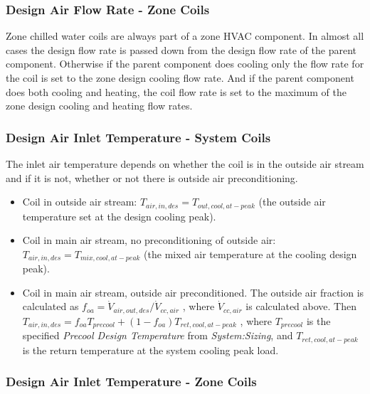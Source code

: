 \subsubsection{Design Air Flow Rate - Zone Coils}\label{design-air-flow-rate---zone-coils}

Zone chilled water coils are always part of a zone HVAC component. In almost all cases the design flow rate is passed down from the design flow rate of the parent component. Otherwise if the parent component does cooling only the flow rate for the coil is set to the zone design cooling flow rate. And if the parent component does both cooling and heating, the coil flow rate is set to the maximum of the zone design cooling and heating flow rates.

\subsubsection{Design Air Inlet Temperature - System Coils}\label{design-air-inlet-temperature---system-coils}

The inlet air temperature depends on whether the coil is in the outside air stream and if it is not, whether or not there is outside air preconditioning.

\begin{itemize}
\item
  Coil in outside air stream: \(T_{air,in,des} = T_{out,cool,at-peak}\) (the outside air temperature set at the design cooling peak).
\item
  Coil in main air stream, no preconditioning of outside air: \(T_{air,in,des} = T_{mix,cool,at-peak}\) (the mixed air temperature at the cooling design peak).
\item
  Coil in main air stream, outside air preconditioned. The outside air fraction is calculated as \(f_{oa} = \dot V_{air,out,des}/\dot V_{cc,air}\) , where \(\dot V_{cc,air}\) is calculated above. Then \(T_{air,in,des} = f_{oa}T_{precool}+\left(1-f_{oa}\right)T_{ret,cool,at-peak}\) , where \(T_{precool}\) is the specified \emph{Precool Design Temperature} from \emph{System:Sizing}, and \(T_{ret,cool,at-peak}\) is the return temperature at the system cooling peak load.
\end{itemize}

\subsubsection{Design Air Inlet Temperature - Zone Coils}\label{design-air-inlet-temperature---zone-coils}

